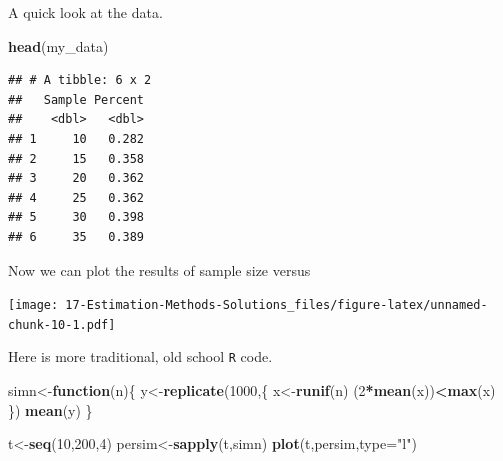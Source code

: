 \documentclass[
]{book}
\newenvironment{Shaded}{\begin{snugshade}}{\end{snugshade}}
\newcommand{\ControlFlowTok}[1]{\textcolor[rgb]{0.13,0.29,0.53}{\textbf{#1}}}
\newcommand{\DataTypeTok}[1]{\textcolor[rgb]{0.13,0.29,0.53}{#1}}
\newcommand{\DecValTok}[1]{\textcolor[rgb]{0.00,0.00,0.81}{#1}}
\newcommand{\KeywordTok}[1]{\textcolor[rgb]{0.13,0.29,0.53}{\textbf{#1}}}
\newcommand{\NormalTok}[1]{#1}
\newcommand{\OperatorTok}[1]{\textcolor[rgb]{0.81,0.36,0.00}{\textbf{#1}}}
\newcommand{\StringTok}[1]{\textcolor[rgb]{0.31,0.60,0.02}{#1}}
\begin{document}
A quick look at the data.

\begin{Shaded}
\begin{Highlighting}[]
\KeywordTok{head}\NormalTok{(my_data)}
\end{Highlighting}
\end{Shaded}

\begin{verbatim}
## # A tibble: 6 x 2
##   Sample Percent
##    <dbl>   <dbl>
## 1     10   0.282
## 2     15   0.358
## 3     20   0.362
## 4     25   0.362
## 5     30   0.398
## 6     35   0.389
\end{verbatim}

Now we can plot the results of sample size versus

\begin{Shaded}
\end{Shaded}

\texttt{[image: 17-Estimation-Methods-Solutions\_files/figure-latex/unnamed-chunk-10-1.pdf]}

Here is more traditional, old school \texttt{R} code.

\begin{Shaded}
\begin{Highlighting}[]
\NormalTok{simn<-}\ControlFlowTok{function}\NormalTok{(n)\{}
\NormalTok{  y<-}\KeywordTok{replicate}\NormalTok{(}\DecValTok{1000}\NormalTok{,\{}
\NormalTok{    x<-}\KeywordTok{runif}\NormalTok{(n)}
\NormalTok{    (}\DecValTok{2}\OperatorTok{*}\KeywordTok{mean}\NormalTok{(x))}\OperatorTok{<}\KeywordTok{max}\NormalTok{(x)}
\NormalTok{  \})}
  \KeywordTok{mean}\NormalTok{(y)}
\NormalTok{\}}

\NormalTok{t<-}\KeywordTok{seq}\NormalTok{(}\DecValTok{10}\NormalTok{,}\DecValTok{200}\NormalTok{,}\DecValTok{4}\NormalTok{)}
\NormalTok{persim<-}\KeywordTok{sapply}\NormalTok{(t,simn)}
\KeywordTok{plot}\NormalTok{(t,persim,}\DataTypeTok{type=}\StringTok{"l"}\NormalTok{)}
\end{Highlighting}
\end{Shaded}
\end{document}
